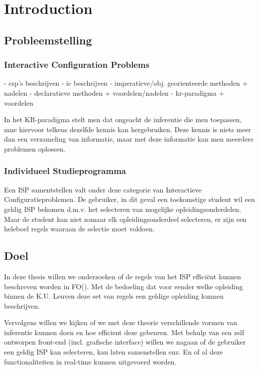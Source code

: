 \chapter{Introduction}
\label{cha:intro}

\section{Probleemstelling}

\subsection{Interactive Configuration Problems}
- csp's beschrijven
- ic beschrijven
- imperatieve/obj. georienteerde methoden + nadelen
- declaratieve methoden + voordelen/nadelen
- kr-paradigma + voordelen

In het KR-paradigma stelt men dat ongeacht de inferentie die men toepassen, mne hiervoor telkens dezelfde kennis kan hergebruiken. Deze kennis is niets meer dan een verzameling van informatie, maar met deze informatie kan men meerdere problemen oplossen. 

\subsection{Individueel Studieprogramma}
Een ISP samentstellen valt onder deze categorie van Interactieve Configuratieproblemen. De gebruiker, in dit geval een toekomstige student wil een geldig ISP bekomen d.m.v. het selecteren van mogelijke opleidingsonderdelen. Maar de student kan niet zomaar elk opleidingsonderdeel selecteren, er zijn een heleboel regels waaraan de selectie moet voldoen. 

\section{Doel}
In deze thesis willen we onderzoeken of de regels van het ISP effici\"{e}nt kunnen beschreven worden in FO(\textperiodcentered). Met de bedoeling dat voor eender welke opleiding binnen de K.U. Leuven deze set van regels een geldige opleiding kunnen beschrijven. 

Vervolgens willen we kijken of we met deze theorie verschillende vormen van inferentie kunnen doen en hoe efficient deze gebeuren. Met behulp van een zelf ontworpen front-end (incl. grafische interface) willen we nagaan of de gebruiker een geldig ISP kan selecteren, kan laten samenstellen enz. En of al deze functionaliteiten in real-time kunnen uitgevoerd worden.

